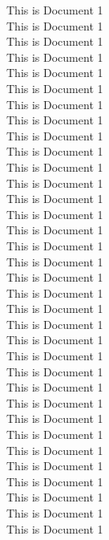 \documentclass[10pt]{article}
\begin{document}
This is Document 1\\
This is Document 1\\
This is Document 1\\
This is Document 1\\
This is Document 1\\
This is Document 1\\
This is Document 1\\
This is Document 1\\
This is Document 1\\
This is Document 1\\
This is Document 1\\
This is Document 1\\
This is Document 1\\
This is Document 1\\
This is Document 1\\
This is Document 1\\
This is Document 1\\
This is Document 1\\
This is Document 1\\
This is Document 1\\
This is Document 1\\
This is Document 1\\
This is Document 1\\
This is Document 1\\
This is Document 1\\
This is Document 1\\
This is Document 1\\
This is Document 1\\
This is Document 1\\
This is Document 1\\
This is Document 1\\
This is Document 1\\
This is Document 1\\
This is Document 1
\end{document}
